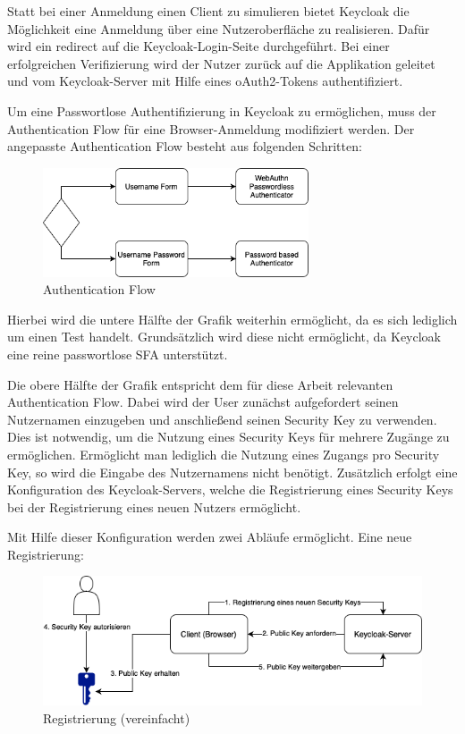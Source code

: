 Statt bei einer Anmeldung einen Client zu simulieren bietet Keycloak die Möglichkeit eine Anmeldung über eine Nutzeroberfläche zu realisieren. Dafür wird ein redirect auf die Keycloak-Login-Seite durchgeführt. Bei einer erfolgreichen Verifizierung wird der Nutzer zurück auf die Applikation geleitet und vom Keycloak-Server mit Hilfe eines oAuth2-Tokens authentifiziert. 

Um eine Passwortlose Authentifizierung in Keycloak zu ermöglichen, muss der Authentication Flow für eine Browser-Anmeldung modifiziert werden. Der angepasste Authentication Flow besteht aus folgenden Schritten:

\begin{figure}[h]
	\centering 
	\includegraphics[width=0.7\textwidth]{img/abbildungen/authentication_flow.png}
	\captionsetup{format=hang}
	\caption{Authentication Flow}
\end{figure}

Hierbei wird die untere Hälfte der Grafik weiterhin ermöglicht, da es sich lediglich um einen Test handelt. Grundsätzlich wird diese nicht ermöglicht, da Keycloak eine reine passwortlose \ac{SFA} unterstützt.

Die obere Hälfte der Grafik entspricht dem für diese Arbeit relevanten Authentication Flow. Dabei wird der User zunächst aufgefordert seinen Nutzernamen einzugeben und anschließend seinen Security Key zu verwenden. Dies ist notwendig, um die Nutzung eines Security Keys für mehrere Zugänge zu ermöglichen. Ermöglicht man lediglich die Nutzung eines Zugangs pro Security Key, so wird die Eingabe des Nutzernamens nicht benötigt. Zusätzlich erfolgt eine Konfiguration des Keycloak-Servers, welche die Registrierung eines Security Keys bei der Registrierung eines neuen Nutzers ermöglicht.

Mit Hilfe dieser Konfiguration werden zwei Abläufe ermöglicht. Eine neue Registrierung:

\begin{figure}[H]
	\centering 
	\includegraphics[width=1\textwidth]{img/abbildungen/register_simplified.png}
	\captionsetup{format=hang}
	\caption{Registrierung (vereinfacht)}
\end{figure}

